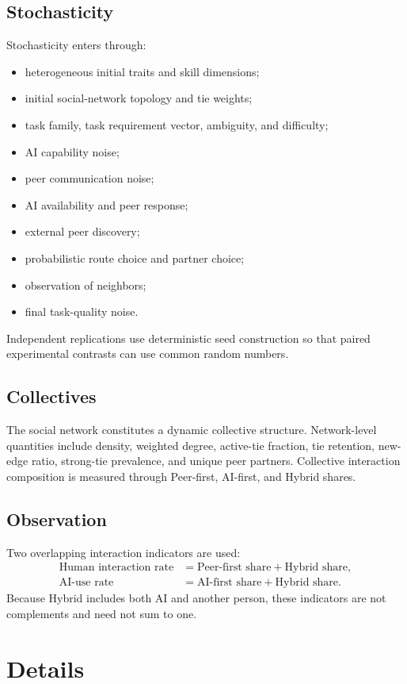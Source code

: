 \documentclass[11pt]{article}
\begin{document}
\subsection{Stochasticity}
Stochasticity enters through:
\begin{itemize}
\item heterogeneous initial traits and skill dimensions;
\item initial social-network topology and tie weights;
\item task family, task requirement vector, ambiguity, and difficulty;
\item AI capability noise;
\item peer communication noise;
\item AI availability and peer response;
\item external peer discovery;
\item probabilistic route choice and partner choice;
\item observation of neighbors;
\item final task-quality noise.
\end{itemize}
Independent replications use deterministic seed construction so that paired experimental contrasts can use common random numbers.

\subsection{Collectives}
The social network constitutes a dynamic collective structure. Network-level quantities include density, weighted degree, active-tie fraction, tie retention, new-edge ratio, strong-tie prevalence, and unique peer partners. Collective interaction composition is measured through Peer-first, AI-first, and Hybrid shares.

\subsection{Observation}
Two overlapping interaction indicators are used:
\begin{align}
\text{Human interaction rate} &= \text{Peer-first share}+\text{Hybrid share},\\
\text{AI-use rate} &= \text{AI-first share}+\text{Hybrid share}.
\end{align}
Because Hybrid includes both AI and another person, these indicators are not complements and need not sum to one.

\section{Details}
\end{document}
